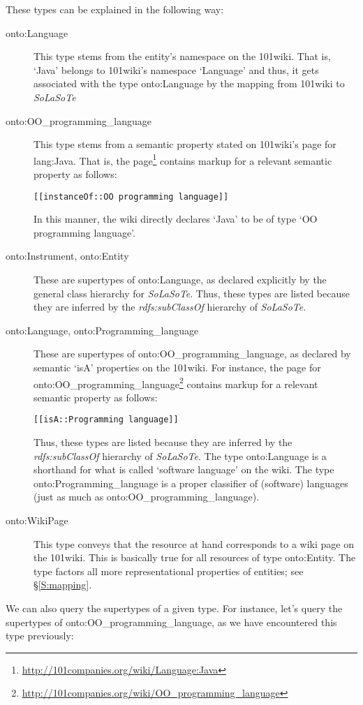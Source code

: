 \documentclass{article}
\newcommand{\uri}[1]{\textsf{#1}}
\newcommand{\ooo}[1]{\textsf{101#1}}%
\newcommand{\solasote}{{\itshape\textsf{SoLaSoTe}}}
\begin{document}
\noindent
These types can be explained in the following way:
%
\begin{description}
%
\item[\uri{onto:Language}] This type stems from the entity's namespace
  on the \ooo{wiki}. That is, `Java' belongs to \ooo{wiki}'s namespace
  `Language' and thus, it gets associated with the type \uri{onto:Language}
  by the mapping from \ooo{wiki} to \solasote
%
\item[\uri{onto:OO\_programming\_language}] This type stems from a
  semantic property stated on \ooo{wiki}'s page for \uri{lang:Java}. That
  is, the
  page\footnote{\url{http://101companies.org/wiki/Language:Java}}
  contains markup for a relevant semantic property as follows:
\begin{center}
\begin{BVerbatim}
[[instanceOf::OO programming language]]
\end{BVerbatim}
\end{center}
\noindent
In this manner, the wiki directly declares `Java' to be of type `OO
programming language'.
%
\item[\uri{onto:Instrument}, \uri{onto:Entity}] These are supertypes
  of \uri{onto:Language}, as declared explicitly by the general class
  hierarchy for \solasote. Thus, these types are listed because they
  are inferred by the \emph{rdfs:subClassOf} hierarchy of \solasote.
%
\item[\uri{onto:Language}, \uri{onto:Programming\_language}]
  These are supertypes of \uri{onto:OO\_programming\_language}, as
  declared by semantic `isA' properties on the \ooo{wiki}. For
  instance, the
  page for \uri{onto:OO\_programming\_language}\footnote{\url{http://101companies.org/wiki/OO_programming_language}}
  contains markup for a relevant semantic property as follows:
\begin{center}
\begin{BVerbatim}
[[isA::Programming language]]
\end{BVerbatim}
\end{center}
\noindent
Thus, these types are listed because they are inferred by the
\emph{rdfs:subClassOf} hierarchy of \solasote. The type
\uri{onto:Language} is a shorthand for what is called `software
language' on the wiki. The type \uri{onto:Programming\_language} is a
proper classifier of (software) languages (just as much as
\uri{onto:OO\_programming\_language}).
%
\item[\uri{onto:WikiPage}] This type conveys that the resource at hand
  corresponds to a wiki page on the \ooo{wiki}. This is basically
  true for all resources of type \uri{onto:Entity}. The type factors
  all more representational properties of entities; see
  \S\ref{S:mapping}.
%
\end{description}
%
We can also query the supertypes of a given type. For instance, let's
query the supertypes of \uri{onto:OO\_programming\_language}, as we
have encountered this type previously:
\end{document}
